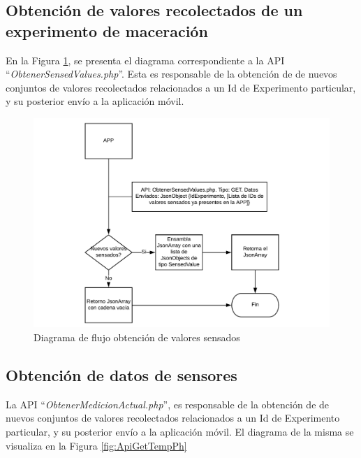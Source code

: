         \subsection{Obtención de valores recolectados de un experimento de maceración}
        \par En la Figura \ref{fig:ApiGet}, se presenta el diagrama correspondiente a la API ``\textit{ObtenerSensedValues.php}''. Esta es responsable de la obtención de de nuevos conjuntos de valores recolectados relacionados a un Id de Experimento particular, y su posterior envío a la aplicación móvil.
            \begin{figure} [htb]
                \centering
                \includegraphics [scale=0.55] {DiagramaAPIGet.pdf}
                \caption{Diagrama de flujo obtención de valores sensados}
                \label{fig:ApiGet}
            \end{figure}
        
        \subsection{Obtención de datos de sensores}
        \par La API ``\textit{ObtenerMedicionActual.php}'', es responsable de la obtención de de nuevos conjuntos de valores recolectados relacionados a un Id de Experimento particular, y su posterior envío a la aplicación móvil. El diagrama de la misma se visualiza en la Figura \ref{fig:ApiGetTempPh}
        

